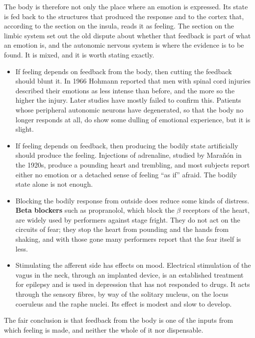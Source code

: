 \documentclass[11pt]{article}
\begin{document}
The body is therefore not only the place where an emotion is expressed. Its state is fed back to the structures that produced the response and to the cortex that, according to the section on the insula, reads it as feeling. The section on the limbic system set out the old dispute about whether that feedback is part of what an emotion is, and the autonomic nervous system is where the evidence is to be found. It is mixed, and it is worth stating exactly.

\begin{itemize}
    \item If feeling depends on feedback from the body, then cutting the feedback should blunt it. In 1966 Hohmann reported that men with spinal cord injuries described their emotions as less intense than before, and the more so the higher the injury. Later studies have mostly failed to confirm this. Patients whose peripheral autonomic neurons have degenerated, so that the body no longer responds at all, do show some dulling of emotional experience, but it is slight.
    \item If feeling depends on feedback, then producing the bodily state artificially should produce the feeling. Injections of adrenaline, studied by Mara\~n\'on in the 1920s, produce a pounding heart and trembling, and most subjects report either no emotion or a detached sense of feeling ``as if'' afraid. The bodily state alone is not enough.
    \item Blocking the bodily response from outside does reduce some kinds of distress. \textbf{Beta blockers} such as propranolol, which block the $\beta$ receptors of the heart, are widely used by performers against stage fright. They do not act on the circuits of fear; they stop the heart from pounding and the hands from shaking, and with those gone many performers report that the fear itself is less.
    \item Stimulating the afferent side has effects on mood. Electrical stimulation of the vagus in the neck, through an implanted device, is an established treatment for epilepsy and is used in depression that has not responded to drugs. It acts through the sensory fibres, by way of the solitary nucleus, on the locus coeruleus and the raphe nuclei. Its effect is modest and slow to develop.
\end{itemize}

The fair conclusion is that feedback from the body is one of the inputs from which feeling is made, and neither the whole of it nor dispensable.
\end{document}
